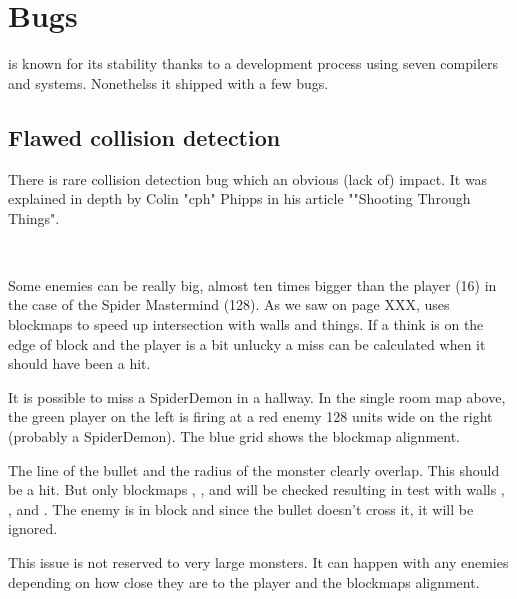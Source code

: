 \section{Bugs}
\doom is known for its stability thanks to a development process using seven compilers and systems. Nonethelss it shipped with a few bugs.








\subsection{Flawed collision detection}
There is rare collision detection bug which an obvious (lack of) impact. It was explained in depth by Colin "cph" Phipps in his article ""Shooting Through Things".\\
\par
{}\\
\par
Some enemies can be really big, almost ten times bigger than the player (16) in the case of the Spider Mastermind (128). As we saw on page XXX, \doom uses blockmaps to speed up intersection with walls and things. If a think is on the edge of block and the player is a bit unlucky a miss can be calculated when it should have been a hit.

\vspace{-1cm}


\par
It is possible to miss a SpiderDemon in a hallway. In the single room map above, the green player on the left is firing at a red enemy 128 units wide on the right (probably a SpiderDemon). The blue grid shows the blockmap alignment.\\
\par
 The line of the bullet and the radius of the monster clearly overlap. This should be a hit. But only blockmaps , , and  will be checked resulting in test with walls , , and . The enemy is in block  and since the bullet doesn't cross it, it will be ignored.\\
 \par
 This issue is not reserved to very large monsters. It can happen with any enemies depending on how close they are to the player and the blockmaps alignment.







